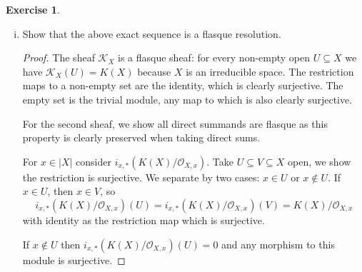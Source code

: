 \documentclass{article}
\renewcommand{\qedsymbol}{\raisebox{-0.5cm}{}}
\newcommand{\sheaf}{\mathcal{O}}
\newcommand{\ff}{\mathcal{K}}
\newenvironment{solution}{\begin{proof}[Solution]\renewcommand\qedsymbol{}}{\end{proof}}
\theoremstyle{definition}
\newtheorem{question}{Exercise}
\begin{document}
\begin{question}
\begin{enumerate}[(i), resume]
\begin{solution}
                  Now we examine the stalk maps:
                  \[
                      \beta_{x}:\ff_{X}\to\left(\bigoplus_{x\in|X|}i_{x,*}(K(X)/\sheaf_{X,x})\right)_{x}.
                  \]
                  For \(y\neq x\) we can easily see that the stalk of
                  \(i_{x,*}(K(X)/\sheaf_{X,x})\) at \(y\) is zero: there is an
                  open neighbourhood of \(y\) separating \(x\) from \(y\)
                  because both are closed points. Taking the stalks commutes
                  with direct sums so \(\beta_{x}\) is the map
                  \[
                      \beta_{x}:\ff_{X,x}=K(X)\to\left(\bigoplus_{x\in|X|}i_{x,*}(K(X)/\sheaf_{X,x})\right)_{x}=(i_{x,*}(K(X)/\sheaf_{X,x}))_{x}=K(X)/\sheaf_{X,x}
                  \]
                  which is clearly surjective. Therefore the induced map
                  \[
                      \ff_{X}/\sheaf_{X}\to\bigoplus_{x\in|X|}i_{x,*}(K(X)/\sheaf_{X,x})
                  \]
                  is both injective and surjective: an isomorphism.
              \end{solution}

        \item Show that the above exact sequence is a flasque resolution.

              \begin{proof}
                  The sheaf \(\ff_{X}\) is a flasque sheaf: for every non-empty
                  open \(U\subseteq X\) we have \(\ff_{X}(U)=K(X)\) because
                  \(X\) is an irreducible space. The restriction maps to a
                  non-empty set are the identity, which is clearly surjective.
                  The empty set is the trivial module, any map to which is also
                  clearly surjective.

                  For the second sheaf, we show all direct summands are flasque
                  as this property is clearly preserved when taking direct sums.

                  For \(x\in|X|\) consider \(i_{x,*}(K(X)/\sheaf_{X,x})\). Take
                  \(U\subseteq V\subseteq X\) open, we show the restriction is
                  surjective. We separate by two cases: \(x\in U\) or \(x\notin
                  U\). If \(x\in U\), then \(x\in V\), so
                  \[
                      i_{x,*}(K(X)/\sheaf_{X,x})(U)=i_{x,*}(K(X)/\sheaf_{X,x})(V)=K(X)/\sheaf_{X,x}
                  \]
                  with identity as the restriction map which is surjective.

                  If \(x\notin U\) then \(i_{x,*}(K(X)/\sheaf_{X,x})(U)=0\) and
                  any morphism to this module is surjective.


\end{proof}
\end{enumerate}
\end{question}
\end{document}
